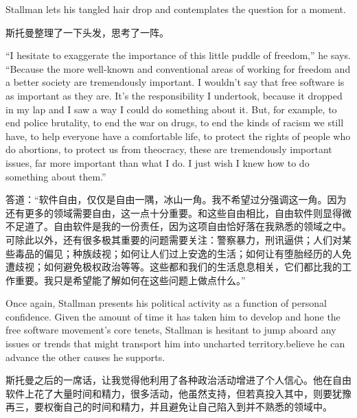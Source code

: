 \ifdefined\eng
Stallman lets his tangled hair drop and contemplates the question for a moment. \ifdefined{} \fi
\fi

\ifdefined\chs
斯托曼整理了一下头发，思考了一阵。 \ifdefined{} \fi
\fi

\ifdefined\eng
``I hesitate to exaggerate the importance of this little puddle of freedom,'' he says. ``Because the more well-known and conventional areas of working for freedom and a better society are tremendously important. I wouldn't say that free software is as important as they are. It's the responsibility I undertook, because it dropped in my lap and I saw a way I could do something about it. But, for example, to end police brutality, to end the war on drugs, to end the kinds of racism we still have, to help everyone have a comfortable life, to protect the rights of people who do abortions, to protect us from theocracy, these are tremendously important issues, far more important than what I do. I just wish I knew how to do something about them.''
\fi

\ifdefined\chs
答道：``软件自由，仅仅是自由一隅，冰山一角。我不希望过分强调这一角。因为还有更多的领域需要自由，这一点十分重要。和这些自由相比，自由软件则显得微不足道了。自由软件是我的一份责任，因为这项自由恰好落在我熟悉的领域之中。可除此以外，还有很多极其重要的问题需要关注：警察暴力，刑讯逼供；人们对某些毒品的偏见；种族歧视；如何让人们过上安逸的生活；如何让有堕胎经历的人免遭歧视；如何避免极权政治等等。这些都和我们的生活息息相关，它们都比我的工作重要。我只是希望能了解如何在这些问题上做点什么。''
\fi

\ifdefined\eng
Once again, Stallman presents his political activity as a function of personal confidence. Given the amount of time it has taken him to develop and hone the free software movement's core tenets, Stallman is hesitant to \ifdefined\vone jump aboard any issues or trends that might transport him into uncharted territory.\fi\ifdefined\vtwo believe he can advance the other causes he supports.\fi
\fi

\ifdefined\chs
斯托曼之后的一席话，让我觉得他利用了各种政治活动增进了个人信心。他在自由软件上花了大量时间和精力，很多活动，他虽然支持，但若真投入其中，则要犹豫再三，要权衡自己的时间和精力，并且避免让自己陷入到并不熟悉的领域中。
\fi

